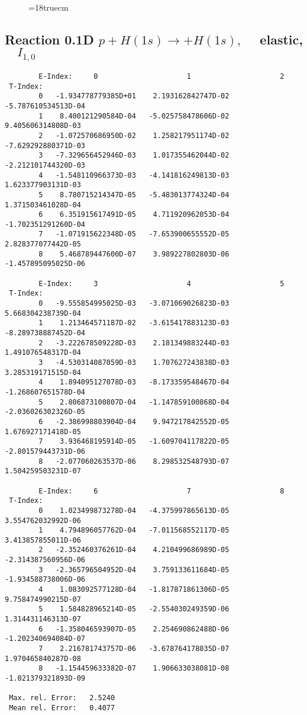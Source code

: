 \begin{figure} \label{0.1T}
\epsfxsize=18truecm
\end{figure}
\newpage


\subsection{
Reaction 0.1D  $p + H(1s) \rightarrow  + H(1s),\quad
$ elastic,$\quad I_{1,0}$
}

\begin{verbatim}
        E-Index:     0                     1                     2
 T-Index:
        0   -1.934778779385D+01    2.193162842747D-02   -5.787610534513D-04
        1    8.400121290584D-04   -5.025758478606D-02    9.405606314808D-03
        2   -1.072570686950D-02    1.258217951174D-02   -7.629292880371D-03
        3   -7.329656452946D-03    1.017355462044D-02   -2.212101744320D-03
        4   -1.548110966373D-03   -4.141816249813D-03    1.623377903131D-03
        5    8.780715214347D-05   -5.483013774324D-04    1.371503461028D-04
        6    6.351915617491D-05    4.711920962053D-04   -1.702351291260D-04
        7   -1.071915622348D-05   -7.653900655552D-05    2.828377077442D-05
        8    5.468789447600D-07    3.989227802803D-06   -1.457895095025D-06

        E-Index:     3                     4                     5
 T-Index:
        0   -9.555854995025D-03   -3.071069026823D-03    5.668304238739D-04
        1    1.213464571187D-02   -3.615417883123D-03   -8.289738887452D-04
        2   -3.222678509228D-03    2.181349883244D-03    1.491076548317D-04
        3   -4.530314087059D-03    1.707627243838D-03    3.285319171515D-04
        4    1.894095127078D-03   -8.173359548467D-04   -1.268607651578D-04
        5    2.806873100807D-04   -1.147859100868D-04   -2.036026302326D-05
        6   -2.386998803904D-04    9.947217842552D-05    1.676927171418D-05
        7    3.936468195914D-05   -1.609704117822D-05   -2.801579443731D-06
        8   -2.077060263537D-06    8.298532548793D-07    1.504259503231D-07

        E-Index:     6                     7                     8
 T-Index:
        0    1.023499873278D-04   -4.375997865613D-05    3.554762032992D-06
        1    4.794896057762D-04   -7.011568552117D-05    3.413857855011D-06
        2   -2.352460376261D-04    4.210499686989D-05   -2.314387560956D-06
        3   -2.365796504952D-04    3.759133611684D-05   -1.934588738006D-06
        4    1.083092577128D-04   -1.817871861306D-05    9.758474990215D-07
        5    1.584828965214D-05   -2.554030249359D-06    1.314431146313D-07
        6   -1.358046593907D-05    2.254690862488D-06   -1.202340694084D-07
        7    2.216781743757D-06   -3.678764178035D-07    1.970465840287D-08
        8   -1.154459633382D-07    1.906633038081D-08   -1.021379321893D-09

 Max. rel. Error:   2.5240
 Mean rel. Error:   0.4077
\end{verbatim}

